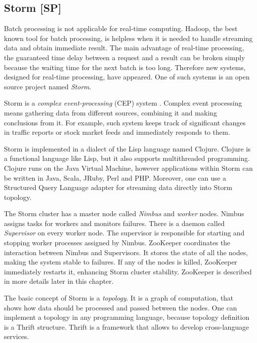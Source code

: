 \subsection{Storm [SP]}
\label{subs:storm}

Batch processing is not applicable for real-time computing.
Hadoop, the best known tool for batch processing, is helpless when it is needed to handle streaming data and obtain immediate result.
The main advantage of real-time processing, the guaranteed time delay between a request and a result can be broken simply because the waiting time for the next batch is too long.
Therefore new systems, designed for real-time processing, have appeared.
One of such systems is an open source project named \textit{Storm}.

Storm is a \textit{complex event-processing} (CEP) system \cite{Storm}.
Complex event processing means gathering data from different sources, combining it and making conclusions from it.
For example, such system keeps track of significant changes in traffic reports or stock market feeds and immediately responds to them. 

Storm is implemented in a dialect of the Lisp language named Clojure.
Clojure is a functional language like Lisp, but it also supports multithreaded programming.
Clojure runs on the Java Virtual Machine, however applications within Storm can be written in Java, Scala, JRuby, Perl and PHP.
Moreover, one can use a Structured Query Language adapter for streaming data directly into Storm topology.

The Storm cluster has a master node called \textit{Nimbus} and \textit{worker} nodes.
Nimbus assigns tasks for workers and monitors failures.
There is a daemon called \textit{Supervisor} on every worker node.
The supervisor is responsible for starting and stopping worker processes assigned by Nimbus.
ZooKeeper coordinates the interaction between Nimbus and Supervisors.
It stores the state of all the nodes, making the system stable to failures.
If any of the nodes is killed, ZooKeeper immediately restarts it, enhancing Storm cluster stability.
ZooKeeper is described in more details later in this chapter.

The basic concept of Storm is a \textit{topology}.
It is a graph of computation, that shows how data should be processed and passed between the nodes.
One can implement a topology in any programming language, because topology definition is a Thrift structure.
Thrift is a framework that allows to develop cross-language services.	

